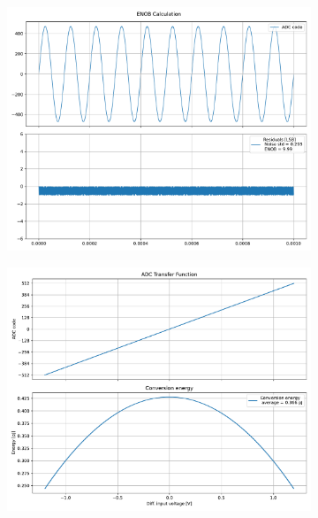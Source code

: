 \documentclass[varwidth]{standalone}
\begin{document}
\begin{figure}
\begin{subfigure}{0.32\textwidth}
    \includegraphics[width=\textwidth]{behavioral_10b_ideal_enob.pdf}
\end{subfigure}
\begin{subfigure}{0.32\textwidth}
    \begin{table}
    \let\center\empty
    \let\endcenter\relax
    \centering
    \resizebox{0.3\width}{!}{}
    \end{table}
    \includegraphics[width=\textwidth]{behavioral_10b_ideal_energy.pdf}
\end{subfigure}
\end{figure}
\end{document}
